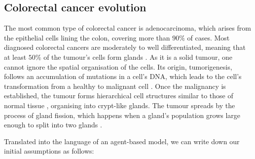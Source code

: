 \subsection{Colorectal cancer evolution}\label{section:assumptions:general}

The most common type of colorectal cancer is adenocarcinoma, which arises from the epithelial cells lining
the colon, covering more than $90\%$ of cases. Most diagnosed
colorectal cancers are moderately to well differentiated, meaning that at least $50\%$ of the tumour's cells
form glands \cite{fleming_colorectal_2012}.
As it is a solid tumour, one cannot ignore the spatial organisation of the cells. Its
origin, tumorigenesis, follows an accumulation of mutations in a cell's DNA, which leads to the cell's transformation
from a healthy to malignant cell \cite{fearon_genetic_1990}. Once the malignancy is established, the tumour
forms hierarchical cell structures similar to those of normal tissue \cite{cernat_colorectal_2014}, organising
into crypt-like glands. The tumour spreads by the process of gland fission, which happens when a gland's
population grows large enough to split into two glands \cite{preston_bottom-up_2003}. \par
Translated into the language of an agent-based model, we can write down our initial assumptions as follows:
